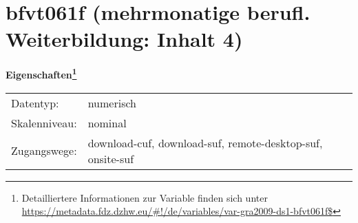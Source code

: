 
    \setcounter{footnote}{0}

    \vspace*{-1.8cm}
	\section{bfvt061f (mehrmonatige berufl. Weiterbildung: Inhalt 4)}
	\label{section:bfvt061f}



    \vspace*{0.5cm}
    \noindent\textbf{Eigenschaften\footnote{Detailliertere Informationen zur Variable finden sich unter
		\url{https://metadata.fdz.dzhw.eu/\#!/de/variables/var-gra2009-ds1-bfvt061f$}}}\\
	\begin{tabularx}{\hsize}{@{}lX}
	Datentyp: & numerisch \\
	Skalenniveau: & nominal \\
	Zugangswege: &
	  download-cuf, 
	  download-suf, 
	  remote-desktop-suf, 
	  onsite-suf
 \\
    \end{tabularx}



